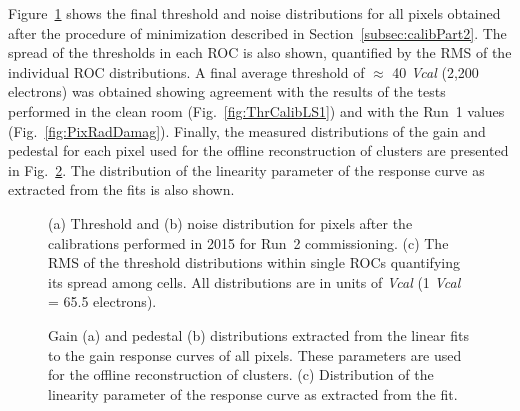 Figure~\ref{fig:ThrCalib2015} shows the final threshold and noise distributions for all pixels obtained after the procedure of minimization described in Section~\ref{subsec:calibPart2}.
The spread of the thresholds in each ROC is also shown, quantified by the RMS of the individual ROC distributions.
A final average threshold of $\approx$ 40 \textit{Vcal} (2,200 electrons) was obtained showing agreement with the results of the tests performed in the clean room (Fig.~\ref{fig:ThrCalibLS1})
and with the Run~1 values (Fig.~\ref{fig:PixRadDamag}).
Finally, the measured distributions of the gain and pedestal for each pixel used for the offline reconstruction of clusters are presented in Fig.~\ref{fig:GainCalib2015}.
The distribution of the linearity parameter of the response curve as extracted from the fits is also shown.

\begin{figure}[!htb]
 \begin{center}
 \end{center}
 \caption{(a) Threshold and (b) noise distribution for pixels after the calibrations performed in 2015 for Run~2 commissioning. (c) The RMS of the threshold distributions within single ROCs quantifying its spread among cells. All distributions are in units of \textit{Vcal} (1 \textit{Vcal} = 65.5 electrons).}
 \label{fig:ThrCalib2015}
\end{figure}

\begin{figure}[!htb]
 \begin{center}
 \end{center}
 \caption{Gain (a) and pedestal (b) distributions extracted from the linear fits to the gain response curves of all pixels. These parameters are used for the offline reconstruction of clusters. (c) Distribution of the linearity parameter of the response curve as extracted from the fit.}
 \label{fig:GainCalib2015}
\end{figure}

